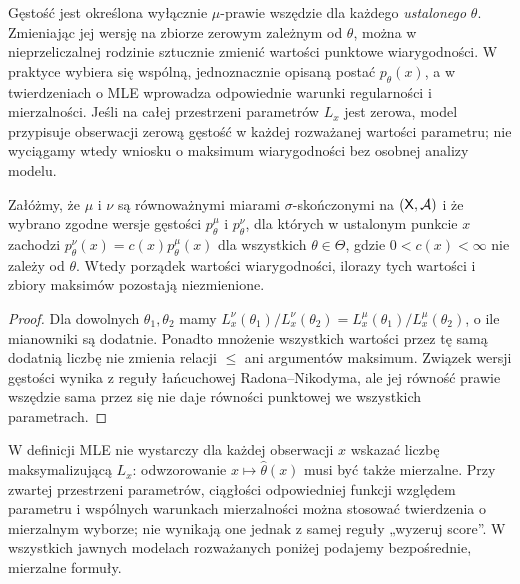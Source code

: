 \begin{uwaga}
Gęstość jest określona wyłącznie $\mu$-prawie wszędzie dla każdego
\emph{ustalonego} $\theta$. Zmieniając jej wersję na zbiorze zerowym
zależnym od $\theta$, można w nieprzeliczalnej rodzinie sztucznie zmienić
wartości punktowe wiarygodności. W praktyce wybiera się wspólną,
jednoznacznie opisaną postać $p_\theta(x)$, a w twierdzeniach o MLE
wprowadza odpowiednie warunki regularności i mierzalności.
Jeśli na całej przestrzeni parametrów $L_x$ jest zerowa, model przypisuje
obserwacji zerową gęstość w każdej rozważanej wartości parametru; nie
wyciągamy wtedy wniosku o maksimum wiarygodności bez osobnej analizy modelu.
\end{uwaga}

\begin{stwierdzenie}\label{prop:change-reference}
Załóżmy, że $\mu$ i $\nu$ są równoważnymi miarami $\sigma$-skończonymi na
$(\mathsf X,\mathcal A)$ i że wybrano zgodne wersje gęstości $p_\theta^\mu$
i $p_\theta^\nu$, dla których w ustalonym punkcie $x$ zachodzi
$p_\theta^\nu(x)=c(x)p_\theta^\mu(x)$ dla wszystkich $\theta\in\Theta$,
gdzie $0<c(x)<\infty$ nie zależy od $\theta$. Wtedy porządek wartości
wiarygodności, ilorazy tych wartości i zbiory maksimów pozostają niezmienione.
\end{stwierdzenie}
\begin{proof}
Dla dowolnych $\theta_1,\theta_2$ mamy
$L_x^\nu(\theta_1)/L_x^\nu(\theta_2)
=L_x^\mu(\theta_1)/L_x^\mu(\theta_2)$, o ile mianowniki są dodatnie.
Ponadto mnożenie wszystkich wartości przez tę samą dodatnią liczbę nie
zmienia relacji $\le$ ani argumentów maksimum. Związek wersji gęstości
wynika z reguły łańcuchowej Radona--Nikodyma, ale jej równość prawie
wszędzie sama przez się nie daje równości punktowej we wszystkich parametrach.
\end{proof}


\begin{uwaga}
W definicji MLE nie wystarczy dla każdej obserwacji $x$ wskazać
liczbę maksymalizującą $L_x$: odwzorowanie $x\mapsto\widehat\theta(x)$
musi być także mierzalne. Przy zwartej przestrzeni parametrów,
ciągłości odpowiedniej funkcji względem parametru i wspólnych
warunkach mierzalności można stosować twierdzenia o mierzalnym
wyborze; nie wynikają one jednak z samej reguły „wyzeruj score”.
W wszystkich jawnych modelach rozważanych poniżej podajemy
bezpośrednie, mierzalne formuły.
\end{uwaga}

